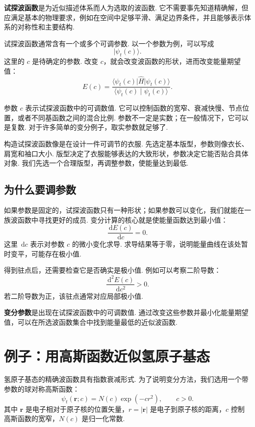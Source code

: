 \documentclass[UTF8,11pt,a4paper,openany]{ctexbook}
\newcommand{\ket}[1]{\lvert #1\rangle}\newcommand{\bra}[1]{\langle #1\rvert}
\newcommand{\braket}[2]{\langle #1\mid #2\rangle}\newcommand{\ii}{\mathrm i}
\newcommand{\dd}{\,\mathrm d}\newcommand{\Ham}{\hat H}\newcommand{\tr}{\operatorname{Tr}}
\newcommand{\term}[1]{\textbf{#1}}
\begin{document}
\term{试探波函数}是为近似描述体系而人为选取的波函数. 它不需要事先知道精确解，但应满足基本的物理要求，例如在空间中足够平滑、满足边界条件，并且能够表示体系的对称性和主要结构. 

试探波函数通常含有一个或多个可调参数. 以一个参数为例，可以写成
\[
\ket{\psi_t(c)}.
\]
这里的 $c$ 是待确定的参数. 改变 $c$，就会改变波函数的形状，进而改变能量期望值：
\[
E(c)=
\frac{\bra{\psi_t(c)}\hat H\ket{\psi_t(c)}}
{\braket{\psi_t(c)}{\psi_t(c)}}.
\]

\begin{notationbox}
参数 $c$ 表示试探波函数中的可调数值. 它可以控制函数的宽窄、衰减快慢、节点位置，或者不同基函数之间的混合比例. 参数不一定是实数；在一般情况下，它可以是复数. 对于许多简单的变分例子，取实参数就足够了. 
\end{notationbox}

\begin{analogybox}
构造试探波函数像是在设计一件可调节的衣服. 先选定基本版型，参数则像衣长、肩宽和袖口大小. 版型决定了衣服能够表达的大致形状，参数决定它能否贴合具体对象. 我们先选一个合理版型，再调整参数，使能量达到最低. 
\end{analogybox}

\subsection{为什么要调参数}

如果参数是固定的，试探波函数只有一种形状；如果参数可以变化，我们就能在一族波函数中寻找更好的成员. 变分计算的核心就是使能量函数达到最小值：
\[
\frac{\dd E(c)}{\dd c}=0.
\]
这里 $\dd c$ 表示对参数 $c$ 的微小变化求导. 求导结果等于零，说明能量曲线在该处暂时变平，可能存在极小值. 

得到驻点后，还需要检查它是否确实是极小值. 例如可以考察二阶导数：
\[
\frac{\dd^2E(c)}{\dd c^2}>0.
\]
若二阶导数为正，该驻点通常对应局部极小值. 

\begin{definitionbox}
\term{变分参数}是出现在试探波函数中的可调数值. 通过改变这些参数并最小化能量期望值，可以在所选波函数集合中找到能量最低的近似波函数. 
\end{definitionbox}

\section{例子：用高斯函数近似氢原子基态}

氢原子基态的精确波函数具有指数衰减形式. 为了说明变分方法，我们选用一个带参数的球对称高斯函数：
\[
\psi_t(\boldsymbol r;c)=N(c)\exp(-cr^2),
\qquad c>0.
\]
其中 $\boldsymbol r$ 是电子相对于原子核的位置矢量，$r=|\boldsymbol r|$ 是电子到原子核的距离，$c$ 控制高斯函数的宽窄，$N(c)$ 是归一化常数. 
\end{document}
